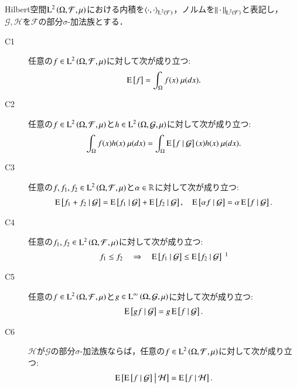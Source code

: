 	\begin{screen}
	\begin{prp}[条件付き期待値の性質]
		Hilbert空間$\operatorname{L}^{2} \left(\Omega, \mathcal{F},\mu\right)$における内積を$\inprod<\cdot,\cdot>_{\Lp{2}{\mathcal{F}}}$，ノルムを$\left\|\, \cdot\, \right\|_{\operatorname{L}^{2} \left(\mathcal{F}\right)}$と表記し，
		$\mathcal{G},\mathcal{H}$を$\mathcal{F}$の部分$\sigma$-加法族とする．
		\begin{description}
			\item[C1] 任意の$f \in \operatorname{L}^{2} \left(\Omega, \mathcal{F},\mu\right)$に対して次が成り立つ:
				\begin{align}
					\operatorname{E} \left[ f \right] = \int_{\Omega} f(x)\ \mu(dx).
				\end{align}
				
			\item[C2]	任意の$f \in \operatorname{L}^{2} \left(\Omega, \mathcal{F},\mu\right)$と$h \in \operatorname{L}^{2} \left(\Omega, \mathcal{G},\mu\right)$に対して次が成り立つ:
				\begin{align}
					\int_{\Omega} f(x)h(x)\ \mu(dx) = \int_{\Omega} \operatorname{E} \left[ f \ \middle|\ \mathcal{G} \right](x)h(x)\ \mu(dx).
				\end{align}
				
			\item[C3]	任意の$f,f_1,f_2 \in \operatorname{L}^{2} \left(\Omega, \mathcal{F},\mu\right)$と$\alpha \in \mathbb{R}$に対して次が成り立つ:
				\begin{align}
					\operatorname{E} \left[ f_1 + f_2 \ \middle|\ \mathcal{G} \right] = \operatorname{E} \left[ f_1 \ \middle|\ \mathcal{G} \right] + \operatorname{E} \left[ f_2 \ \middle|\ \mathcal{G} \right],
					\quad \operatorname{E} \left[ \alpha f \ \middle|\ \mathcal{G} \right] = \alpha \operatorname{E} \left[ f \ \middle|\ \mathcal{G} \right].
				\end{align}

			\item[C4]	任意の$f_1,f_2 \in \operatorname{L}^{2} \left(\Omega, \mathcal{F},\mu\right)$に対して次が成り立つ:
				\begin{align}
					f_1 \leq f_2 \quad \Rightarrow \quad \cexp{f_1}{\mathcal{G}} \leq \cexp{f_2}{\mathcal{G}} \ \footnotemark
				\end{align}
			
			\item[C5]	任意の$f \in \operatorname{L}^{2} \left(\Omega, \mathcal{F},\mu\right)$と$g \in \operatorname{L}^{\infty} \left(\Omega, \mathcal{G},\mu\right)$に対して次が成り立つ:
				\begin{align}
					\operatorname{E} \left[ gf \ \middle|\ \mathcal{G} \right] = g\operatorname{E} \left[ f \ \middle|\ \mathcal{G} \right].
				\end{align}
			
			\item[C6]	$\mathcal{H}$が$\mathcal{G}$の部分$\sigma$-加法族ならば，任意の$f \in \operatorname{L}^{2} \left(\Omega, \mathcal{F},\mu\right)$に対して次が成り立つ:
				\begin{align}
					\operatorname{E} \left[ \operatorname{E} \left[ f \ \middle|\ \mathcal{G} \right] \ \middle|\ \mathcal{H} \right] = \operatorname{E} \left[ f \ \middle|\ \mathcal{H} \right].
				\end{align}
		\end{description}
		\label{prp:L2_conditional_expectation}
	\end{prp}
	\end{screen}
	
